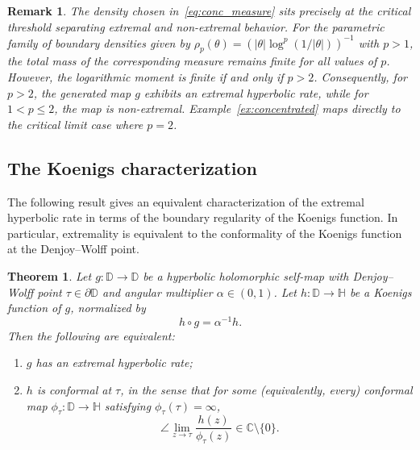 \documentclass[10pt,a4paper]{amsart}
\numberwithin{equation}{section}
\newtheorem{theorem}[equation]{Theorem}
\newtheorem{remark}[equation]{Remark}
\begin{document}
\begin{remark}
The density chosen in~\eqref{eq:conc_measure} sits precisely at the critical threshold separating extremal and non-extremal behavior. For the parametric family of boundary densities given by $\rho_p(\theta) = (|\theta|\log^p(1/|\theta|))^{-1}$ with $p>1$, the total mass of the corresponding measure remains finite for all values of $p$. However, the logarithmic moment is finite if and only if $p>2$. Consequently, for $p>2$, the generated map $g$ exhibits an extremal hyperbolic rate, while for $1<p\le 2$, the map is non-extremal. Example~\ref{ex:concentrated} maps directly to the critical limit case where $p=2$.
\end{remark}




\subsection{The Koenigs characterization}
\label{subsec:koenigs_characterization}

The following result gives an equivalent characterization of the
extremal hyperbolic rate in terms of the boundary regularity of the
Koenigs function. In particular, extremality is equivalent to the
conformality of the Koenigs function at the Denjoy--Wolff point.

\begin{theorem}
\label{thm:koenigs_criterion}
Let $g:\mathbb{D}\to\mathbb{D}$ be a hyperbolic holomorphic self-map
with Denjoy--Wolff point $\tau\in\partial\mathbb{D}$ and angular
multiplier $\alpha\in(0,1)$. Let
$h:\mathbb{D}\to\mathbb{H}$ be a Koenigs function of $g$, normalized by
\begin{equation*}
h\circ g=\alpha^{-1}h.
\end{equation*}
Then the following are equivalent:
\begin{enumerate}
\item[\emph{(i)}] $g$ has an extremal hyperbolic rate;
\item[\emph{(ii)}] $h$ is conformal at $\tau$, in the sense that
for some (equivalently, every) conformal map
$\phi_\tau:\mathbb{D}\to\mathbb{H}$ satisfying
$\phi_\tau(\tau)=\infty$,
\begin{equation*}
\label{eq:koenigs_boundary_ratio}
\angle\lim_{z\to\tau}
\frac{h(z)}{\phi_\tau(z)}
\in\mathbb{C}\setminus\{0\}.
\end{equation*}
\end{enumerate}
\end{theorem}
\end{document}
